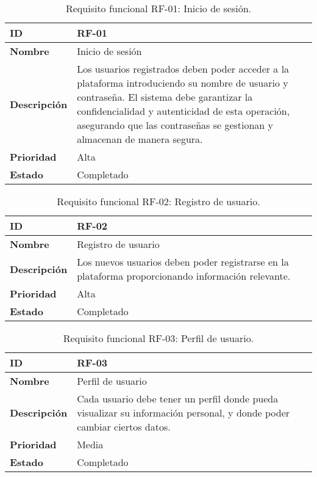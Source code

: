 \begin{table}[H]
    \centering
    \begin{tabular}{|l|p{9.5cm}|}
        \hline
        \textbf{ID} & RF-01 \\
        \hline
        \textbf{Nombre} & Inicio de sesión \\
        \hline
        \textbf{Descripción} & Los usuarios registrados deben poder acceder a la plataforma introduciendo su nombre de usuario y contraseña. El sistema debe garantizar la confidencialidad y autenticidad de esta operación, asegurando que las contraseñas se gestionan y almacenan de manera segura. \\
        \hline
        \textbf{Prioridad} & Alta \\
        \hline
        \textbf{Estado} & Completado \\
        \hline
    \end{tabular}
    \caption{Requisito funcional RF-01: Inicio de sesión.}
    \label{table:req-RF001}
\end{table}

\begin{table}[H]
    \centering
    \begin{tabular}{|l|p{9.5cm}|}
        \hline
        \textbf{ID} & RF-02 \\
        \hline
        \textbf{Nombre} & Registro de usuario \\
        \hline
        \textbf{Descripción} & Los nuevos usuarios deben poder registrarse en la plataforma proporcionando información relevante. \\
        \hline
        \textbf{Prioridad} & Alta \\
        \hline
        \textbf{Estado} & Completado \\
        \hline
    \end{tabular}
    \caption{Requisito funcional RF-02: Registro de usuario.}
    \label{table:req-RF002}
\end{table}

\begin{table}[H]
    \centering
    \begin{tabular}{|l|p{9.5cm}|}
        \hline
        \textbf{ID} & RF-03 \\
        \hline
        \textbf{Nombre} & Perfil de usuario \\
        \hline
        \textbf{Descripción} & Cada usuario debe tener un perfil donde pueda visualizar su información personal, y donde poder cambiar ciertos datos.\\
        \hline
        \textbf{Prioridad} & Media \\
        \hline
        \textbf{Estado} & Completado \\
        \hline
    \end{tabular}
    \caption{Requisito funcional RF-03: Perfil de usuario.}
    \label{table:req-RF005}
\end{table}
    

